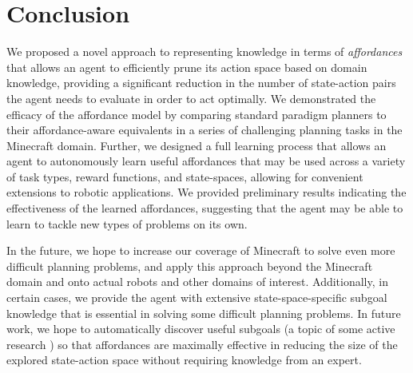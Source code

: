 \documentclass[letterpaper]{article}
\begin{document}
\section{Conclusion}
\label{sec:conclusion}

We proposed a novel approach to representing knowledge in terms of
{\em affordances}~\cite{gibson77} that allows an agent to efficiently
prune its action space based on domain knowledge,
providing a significant reduction in the number of state-action pairs the
agent needs to evaluate in order to act optimally. We demonstrated the efficacy of the affordance model by comparing standard paradigm
planners to their affordance-aware equivalents in a series of challenging planning tasks in the Minecraft
domain. Further, we designed a full learning process that allows an agent to autonomously learn useful affordances that may be used
across a variety of task types, reward functions, and state-spaces, allowing for convenient extensions to robotic applications.
We provided preliminary results indicating the effectiveness of the learned affordances, suggesting that
the agent may be able to learn to tackle new types of problems on its own.

In the future, we hope to increase our coverage of Minecraft to solve even more difficult planning problems, and apply this
approach beyond the Minecraft domain and onto actual robots and other domains of interest. Additionally, in certain cases, we provide
the agent with extensive state-space-specific subgoal knowledge that is essential in solving some difficult planning problems. In future work,
we hope to automatically discover useful subgoals (a topic of some active research \cite{Mcgovern01automaticdiscovery, Simsek:2005:IUS:1102351.1102454}) so that affordances are maximally effective in reducing the size of the explored state-action space without requiring knowledge from an expert.



\end{document}
